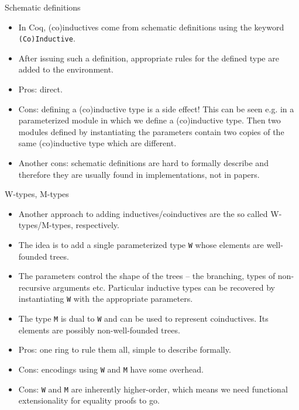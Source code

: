 \documentclass{beamer}
\begin{document}
\begin{frame}{Schematic definitions}
\begin{itemize}
	\item In Coq, (co)inductives come from schematic definitions using the keyword \texttt{(Co)Inductive}.
	\item After issuing such a definition, appropriate rules for the defined type are added to the environment.
	\item Pros: direct.
	\item Cons: defining a (co)inductive type is a side effect! This can be seen e.g. in a parameterized module in which we define a (co)inductive type. Then two modules defined by instantiating the parameters contain two copies of the same (co)inductive type which are different.
	\item Another cons: schematic definitions are hard to formally describe and therefore they are usually found in implementations, not in papers.
\end{itemize}
\end{frame}

\begin{frame}{W-types, M-types}
\begin{itemize}
	\item Another approach to adding inductives/coinductives are the so called W-types/M-types, respectively.
	\item The idea is to add a single parameterized type \texttt{W} whose elements are well-founded trees.
	\item The parameters control the shape of the trees -- the branching, types of non-recursive arguments etc. Particular inductive types can be recovered by instantiating \texttt{W} with the appropriate parameters.
	\item The type \texttt{M} is dual to \texttt{W} and can be used to represent coinductives. Its elements are possibly non-well-founded trees.
	\item Pros: one ring to rule them all, simple to describe formally.
	\item Cons: encodings using \texttt{W} and \texttt{M} have some overhead.
	\item Cons: \texttt{W} and \texttt{M} are inherently higher-order, which means we need functional extensionality for equality proofs to go.
\end{itemize}
\end{frame}
\end{document}
